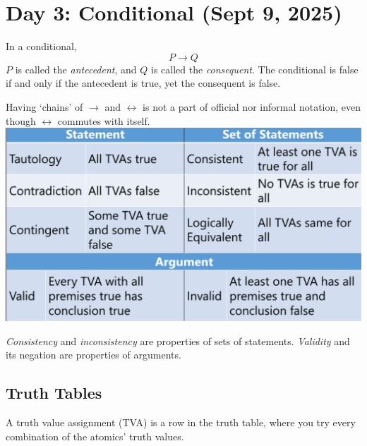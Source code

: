 \section{Day 3: Conditional (Sept 9, 2025)}
In a conditional,
\[
P \to Q
\]
$P$ is called the \textit{antecedent}, and $Q$ is called the \textit{consequent}. The conditional is false if and only if the antecedent is true, yet the consequent is false.

Having `chains' of $\to$ and $\leftrightarrow$ is not a part of official nor informal notation, even though $\leftrightarrow$ commutes with itself. \\

\includegraphics{phl245/figures/sematics.jpg}

\textit{Consistency} and \textit{inconsistency} are properties of sets of statements. \textit{Validity} and its negation are properties of arguments.

\subsection{Truth Tables}
A truth value assignment (TVA) is a row in the truth table, where you try every combination of the atomics' truth values.
